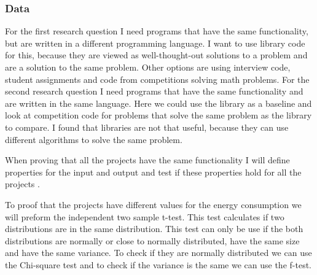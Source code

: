 \subsubsection{Data}
For the first research question I need programs that have the same functionality, but are written in a different programming language. I want to use library code for this, because they are viewed as well-thought-out solutions to a problem and are a solution to the same problem. Other options are using interview code, student assignments and code from competitions solving math problems. For the second research question I need programs that have the same functionality and are written in the same language. Here we could use the library as a baseline and look at competition code for problems that solve the same problem as the library to compare. I found that libraries are not that useful, because they can use different algorithms to solve the same problem. 


When proving that all the projects have the same functionality I will define properties for the input and output and test if these properties hold for all the projects \cite{mens2004survey}.

To proof that the projects have different values for the energy consumption we will preform the independent two sample t-test. This test calculates if two distributions are in the same distribution. This test can only be use if the both distributions are normally or close to normally distributed, have the same size and have the same variance. To check if they are normally distributed we can use the Chi-square test and to check if the variance is the same we can use the f-test.


